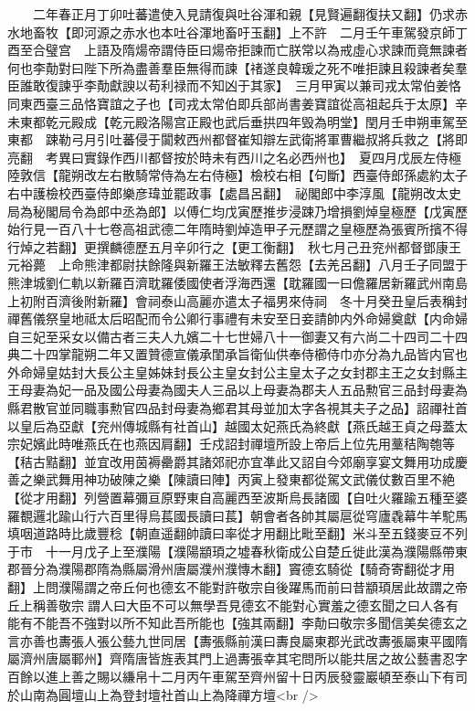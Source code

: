 　　二年春正月丁卯吐蕃遣使入見請復與吐谷渾和親【見賢遍翻復扶又翻】仍求赤水地畜牧【即河源之赤水也本吐谷渾地畜吁玉翻】上不許　二月壬午車駕發京師丁酉至合璧宫　上語及隋煬帝謂侍臣曰煬帝拒諫而亡朕常以為戒虛心求諫而竟無諫者何也李勣對曰陛下所為盡善羣臣無得而諫【禇遂良韓瑗之死不唯拒諫且殺諫者矣羣臣誰敢復諫乎李勣獻諛以苟利禄而不知凶于其家】　三月甲寅以兼司戎太常伯姜恪同東西臺三品恪寶誼之子也【司戎太常伯即兵部尚書姜寶誼從高祖起兵于太原】辛未東都乾元殿成【乾元殿洛陽宫正殿也武后垂拱四年毁為明堂】閏月壬申朔車駕至東都　踈勒弓月引吐蕃侵于闐敕西州都督崔知辯左武衛將軍曹繼叔將兵救之【將即亮翻　考異曰實錄作西川都督按於時未有西川之名必西州也】　夏四月戊辰左侍極陸敦信【龍朔改左右散騎常侍為左右侍極】檢校右相【句斷】西臺侍郎孫處約太子右中護檢校西臺侍郎樂彦瑋並罷政事【處昌呂翻】　祕閣郎中李淳風【龍朔改太史局為秘閣局令為郎中丞為郎】以傅仁均戊寅歷推步浸踈乃增損劉焯皇極歷【戊寅歷始行見一百八十七卷高祖武德二年隋時劉焯造甲子元歷謂之皇極歷為張賓所擯不得行焯之若翻】更撰麟德歷五月辛卯行之【更工衡翻】　秋七月己丑兖州都督鄧康王元裕薨　上命熊津都尉扶餘隆與新羅王法敏釋去舊怨【去羌呂翻】八月壬子同盟于熊津城劉仁軌以新羅百濟耽羅倭國使者浮海西還【耽羅國一曰儋羅居新羅武州南島上初附百濟後附新羅】會祠泰山高麗亦遣太子福男來侍祠　冬十月癸丑皇后表稱封禪舊儀祭皇地祗太后昭配而令公卿行事禮有未安至日妾請帥内外命婦奠獻【内命婦自三妃至采女以備古者三夫人九嬪二十七世婦八十一御妻又有六尚二十四司二十四典二十四掌龍朔二年又置贊德宣儀承閨承旨衛仙供奉侍櫛侍巾亦分為九品皆内官也外命婦皇姑封大長公主皇姊妹封長公主皇女封公主皇太子之女封郡主王之女封縣主王母妻為妃一品及國公母妻為國夫人三品以上母妻為郡夫人五品勲官三品封母妻為縣君散官並同職事勲官四品封母妻為鄉君其母並加太字各視其夫子之品】詔禪社首以皇后為亞獻【兖州傳城縣有社首山】越國太妃燕氏為終獻【燕氏越王貞之母蓋太宗妃嬪此時唯燕氏在也燕因肩翻】壬戍詔封禪壇所設上帝后上位先用藳秸陶匏等【秸古黠翻】並宜改用茵褥罍爵其諸郊祀亦宜凖此又詔自今郊廟享宴文舞用功成慶善之樂武舞用神功破陳之樂【陳讀曰陣】丙寅上發東都從駕文武儀仗數百里不絶【從才用翻】列營置幕彌亘原野東自高麗西至波斯烏長諸國【自吐火羅踰五種至婆羅覩邏北踰山行六百里得烏萇國長讀曰萇】朝會者各帥其屬扈從穹廬毳幕牛羊駝馬填咽道路時比歲豐稔【朝直遥翻帥讀曰率從才用翻比毗至翻】米斗至五錢麥豆不列于市　十一月戊子上至濮陽【濮陽顓頊之墟春秋衛成公自楚丘徙此漢為濮陽縣帶東郡晉分為濮陽郡隋為縣屬滑州唐屬濮州濮慱木翻】竇德玄騎從【騎奇寄翻從才用翻】上問濮陽謂之帝丘何也德玄不能對許敬宗自後躍馬而前曰昔顓頊居此故謂之帝丘上稱善敬宗謂人曰大臣不可以無學吾見德玄不能對心實羞之德玄聞之曰人各有能有不能吾不強對以所不知此吾所能也【強其兩翻】李勣曰敬宗多聞信美矣德玄之言亦善也夀張人張公藝九世同居【夀張縣前漢曰夀良屬東郡光武改夀張屬東平國隋屬濟州唐屬鄆州】齊隋唐皆旌表其門上過夀張幸其宅問所以能共居之故公藝書忍字百餘以進上善之賜以縑帛十二月丙午車駕至齊州留十日丙辰發靈巖頓至泰山下有司於山南為圓壇山上為登封壇社首山上為降禪方壇<br />
